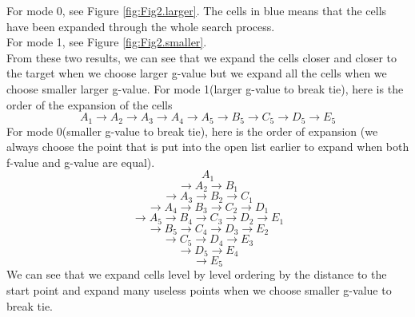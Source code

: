 \documentclass[11pt]{article}
\begin{document}
\newline 
For mode 0, see Figure \ref{fig:Fig2.larger}.
The cells in blue means that the cells have been expanded through the whole search process.\\ 
For mode 1, see Figure \ref{fig:Fig2.smaller}.\\
From  these two results, we can see that we expand the cells closer and closer to the target when we choose larger g-value but we expand all the cells when we choose smaller larger g-value. For mode 1(larger g-value to break tie), here is the order of the expansion of the cells $$A_1\to A_2\to A_3\to A_4\to A_5\to B_5\to C_5\to D_5\to E_5$$
For mode 0(smaller g-value to break tie), here is the order of expansion (we always choose the point that is put into the open list earlier to expand when both f-value and g-value are equal).
$$A_1$$
$$\to A_2\to B_1$$
$$\to A_3\to B_2\to C_1$$
$$\to A_4\to B_3\to C_2\to D_1$$
$$\to A_5\to B_4\to C_3\to D_2\to E_1$$
$$\to B_5\to C_4\to D_3\to E_2$$
$$\to C_5\to D_4\to E_3$$
$$\to D_5\to E_4$$
$$\to E_5$$
We can see that we  expand cells level by level ordering by the distance to the start point and expand many useless points  when we choose smaller g-value to break tie.


\end{document}
